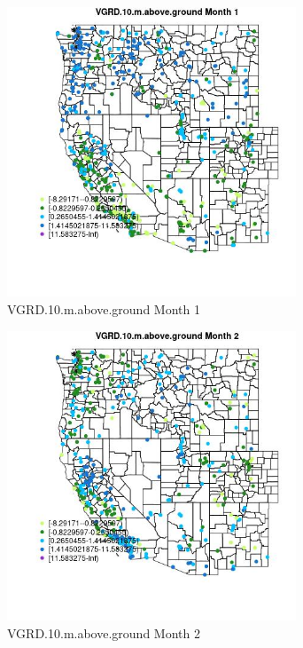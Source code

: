\begin{figure} 
\centering  
\includegraphics[width=0.77\textwidth]{Code_Outputs/Report_ML_input_PM25_Step4_part_e_de_duplicated_aves_compiled_2019-05-18wNAs_MapObsMo1VGRD10maboveground.jpg} 
\caption{\label{fig:Report_ML_input_PM25_Step4_part_e_de_duplicated_aves_compiled_2019-05-18wNAsMapObsMo1VGRD10maboveground}VGRD.10.m.above.ground Month 1} 
\end{figure} 
 

\begin{figure} 
\centering  
\includegraphics[width=0.77\textwidth]{Code_Outputs/Report_ML_input_PM25_Step4_part_e_de_duplicated_aves_compiled_2019-05-18wNAs_MapObsMo2VGRD10maboveground.jpg} 
\caption{\label{fig:Report_ML_input_PM25_Step4_part_e_de_duplicated_aves_compiled_2019-05-18wNAsMapObsMo2VGRD10maboveground}VGRD.10.m.above.ground Month 2} 
\end{figure} 
 

